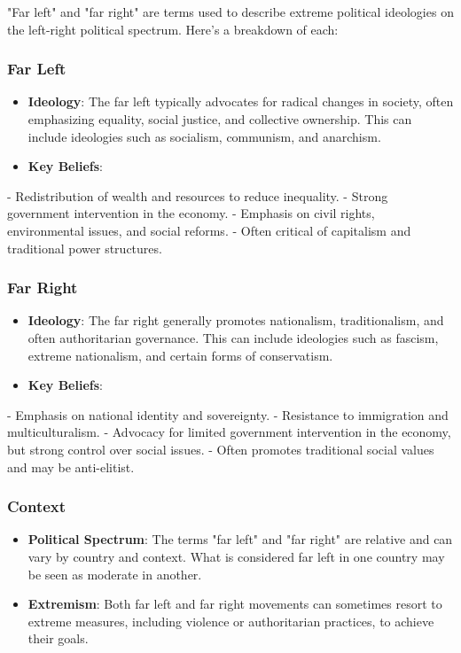 \begin{botresponse}

"Far left" and "far right" are terms used to describe extreme political ideologies on the left-right political spectrum. Here's a breakdown of each:

\subsubsection{Far Left}

\begin{itemize}
\item \textbf{Ideology}: The far left typically advocates for radical changes in society, often emphasizing equality, social justice, and collective ownership. This can include ideologies such as socialism, communism, and anarchism.
\item \textbf{Key Beliefs}:
\end{itemize}

- Redistribution of wealth and resources to reduce inequality.
- Strong government intervention in the economy.
- Emphasis on civil rights, environmental issues, and social reforms.
- Often critical of capitalism and traditional power structures.

\subsubsection{Far Right}

\begin{itemize}
\item \textbf{Ideology}: The far right generally promotes nationalism, traditionalism, and often authoritarian governance. This can include ideologies such as fascism, extreme nationalism, and certain forms of conservatism.
\item \textbf{Key Beliefs}:
\end{itemize}

- Emphasis on national identity and sovereignty.
- Resistance to immigration and multiculturalism.
- Advocacy for limited government intervention in the economy, but strong control over social issues.
- Often promotes traditional social values and may be anti-elitist.

\subsubsection{Context}

\begin{itemize}
\item \textbf{Political Spectrum}: The terms "far left" and "far right" are relative and can vary by country and context. What is considered far left in one country may be seen as moderate in another.
\item \textbf{Extremism}: Both far left and far right movements can sometimes resort to extreme measures, including violence or authoritarian practices, to achieve their goals.
\end{itemize}


\end{botresponse}
